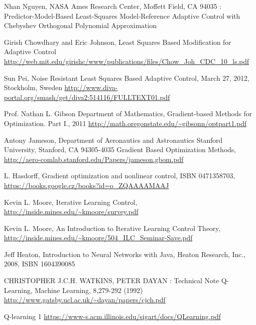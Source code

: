 \begin{thebibliography}{99}                                \label{literatura}

 Nhan Nguyen, NASA Ames Research Center, Moffett Field, CA 94035 :
Predictor-Model-Based Least-Squares Model-Reference Adaptive Control with Chebyshev Orthogonal Polynomial Approximation

 Girish Chowdhary and Eric Johnson, Least  Squares  Based  Modification  for  Adaptive  Control
\url{http://web.mit.edu/girishc/www/publications/files/Chow_Joh_CDC_10_ls.pdf}

Sun Pei, Noise Resistant Least Squares Based Adaptive Control, March 27, 2012, Stockholm, Sweden
\url{http://www.diva-portal.org/smash/get/diva2:514116/FULLTEXT01.pdf}

 
 Prof. Nathan L. Gibson Department of Mathematics,
Gradient-based Methods for Optimization. Part I., 2011
\url{http://math.oregonstate.edu/~gibsonn/optpart1.pdf}

 Antony Jameson,
Department of Aeronautics and Astronautics
Stanford University, Stanford, CA 94305-4035
Gradient Based Optimization Methods,
\url{http://aero-comlab.stanford.edu/Papers/jameson.gbom.pdf}

 L. Hasdorff, Gradient optimization and nonlinear control,
ISBN	0471358703, \url{https://books.google.cz/books?id=o\_ZQAAAAMAAJ}

 Kevin L. Moore, Iterative Learning Control,
\url{http://inside.mines.edu/~kmoore/survey.pdf}

  Kevin L. Moore, An Introduction to Iterative Learning Control Theory,
\url{http://inside.mines.edu/~kmoore/504_ILC_Seminar-Save.pdf}

 Jeff Heaton, Introduction to Neural Networks with Java,
Heaton Research, Inc., 2008, ISBN	1604390085


CHRISTOPHER  J.C.H. WATKINS, PETER DAYAN : Technical Note Q-Learning,
Machine Learning,  8,279-292 (1992)
\url{http://www.gatsby.ucl.ac.uk/~dayan/papers/cjch.pdf}

 Q-learning 1
\url{https://www-s.acm.illinois.edu/sigart/docs/QLearning.pdf}


\end{thebibliography}
